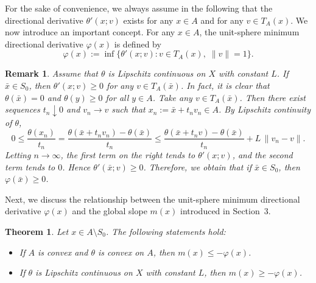 \documentclass[11pt]{article}
\newtheorem{theorem}{Theorem}[section]
\newtheorem{remark}{Remark}[section]
\begin{document}
For the sake of convenience, we   always assume in the following that the directional derivative  $	\theta'(x; v)$  exists for any $x \in A$ and for any  $v\in T_A({x})$.
We now introduce an important concept. For any \(x \in A\),   the unit-sphere minimum directional derivative \(\varphi(x)\) is defined  by
\[
\varphi(x) := \inf\bigl\{ \theta'(x; v) : v \in T_A(x),\; \|v\| = 1 \bigr\}.
\]


\begin{remark}   \label{RqXEQ}   Assume that $\theta$ is   Lipschitz continuous on $X$ with constant $L$.       If $\bar{x} \in S_0$,  then $\theta'(x;v)\ge 0$ for any $v\in T_A(\bar{x})$.  In fact, it is clear that 
	$\theta(\bar{x} )=0$ and $\theta(y)\ge 0$ for all $y\in A$. 
	Take any $v\in T_A(\bar{x})$. Then there exist sequences $t_n\downarrow0$ and $v_n\to v$ such that $x_n:=\bar{x}+t_n v_n\in A$. By Lipschitz continuity of $\theta$,
	\[
	0\le\frac{\theta(x_n)}{t_n}= \frac{\theta(\bar{x}+t_n v_n)-\theta(\bar{x})}{t_n}
	\le \frac{\theta(\bar{x}+t_n v)-\theta(\bar{x})}{t_n}+  L  \,\|v_n-v\|.
	\]
	Letting $n\to\infty$, the first term on the right tends to $\theta'(x;v)$, and the second term tends to $0$. Hence $\theta'(\bar{x};v)\ge 0$.   Therefore,  we obtain that if $\bar{x} \in S_0$,  then  $\varphi(\bar{x}) \geq 0$.
\end{remark}



Next,  we discuss the relationship between the unit-sphere minimum directional derivative \(\varphi(x)\) and the global slope \(m(x)\) introduced in Section~3.



\begin{theorem}   \label{ThyvQ} 
	Let \(x\in A\setminus S_0\).	The following statements hold:
	\begin{itemize}
		\item[(i)]  If $A$ is convex and $\theta$ is convex on $A$, then \(m(x)\le -\varphi(x)\).
		\item[(ii)]  If  $\theta$ is   Lipschitz continuous on $X$ with constant $L$, then \(m(x)\ge -\varphi(x)\).
	\end{itemize}
\end{theorem}
\end{document}
